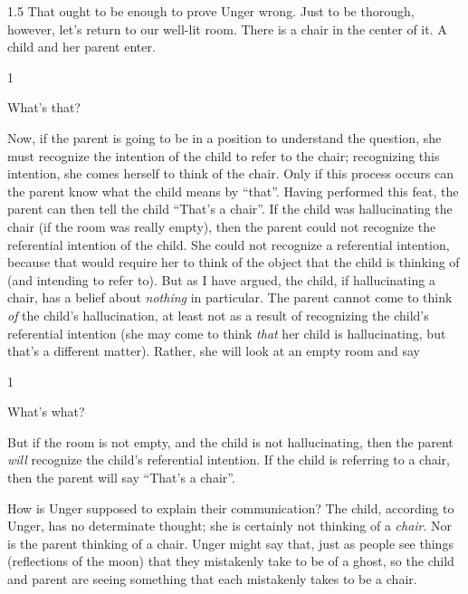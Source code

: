 \documentclass[11pt]{article}
\newcommand{\stage}[3]%
{%
	\begin{spacing}{1}%
	\vspace{0pt}
		\begin{description}[style=nextline, parsep=0pt, leftmargin=15mm, itemindent=-10mm, font=\mdseries]
			\item[\textsc{#1} \emph{#2}] #3
		\end{description}%
	\end{spacing}%
}
\begin{document}
\begin{spacing}{1.5}
That ought to be enough to prove Unger wrong. Just to be thorough, however, let's return to our well-lit room. There is a chair in the center of it. A child and her parent enter.

\stage{Child}{(pointing at the chair)}{What's that?}

Now, if the parent is going to be in a position to understand the question, she must recognize the intention of the child to refer to the chair; recognizing this intention, she comes herself to think of the chair. Only if this process occurs can the parent know what the child means by ``that''. Having performed this feat, the parent can then tell the child ``That's a chair''. If the child was hallucinating the chair (if the room was really empty), then the parent could not recognize the referential intention of the child. She could not recognize a referential intention, because that would require her to think of the object that the child is thinking of (and intending to refer to). But as I have argued, the child, if hallucinating a chair, has a belief about {\em nothing} in particular. The parent cannot come to think {\em of} the child's hallucination, at least not as a result of recognizing the child's referential intention (she may come to think {\em that} her child is hallucinating, but that's a different matter). Rather, she will look at an empty room and say

\stage{Parent}{}{What's what?}

But if the room is not empty, and the child is not hallucinating, then the parent {\em will} recognize the child's referential intention. If the child is referring to a chair, then the parent will say ``That's a chair''.

%
%

How is Unger supposed to explain their communication? The child, according to Unger, has no determinate thought; she is certainly not thinking of a {\em chair}. Nor is the parent thinking of a chair. Unger might say that, just as people see things (reflections of the moon) that they mistakenly take to be of a ghost, so the child and parent are seeing something that each mistakenly takes to be a chair.


\end{spacing}
\end{document}
